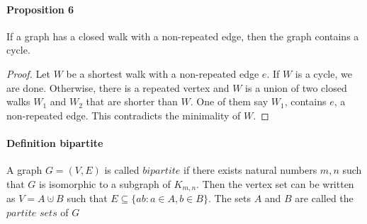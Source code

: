 \paragraph{Proposition 6} If a graph has a closed walk with a non-repeated edge, then
the graph contains a cycle.
\begin{proof}
    Let $ W $ be a shortest walk with a non-repeated edge $ e $. If $ W $ is a cycle, 
    we are done. Otherwise, there is a repeated vertex and $ W $ is a union of 
    two closed walks $ W_1 $ and $ W_2 $ that are shorter than $ W $. One of them
    say $ W_1 $, contains $ e$, a non-repeated edge. This contradicts the 
    minimality of $ W$.
\end{proof}

\paragraph{Definition bipartite}
A graph $ G = (V,E) $ is called $ bipartite $ if there exists natural numbers $ m,n $
such that $ G $ is isomorphic to a subgraph of $ K_{m,n} $. Then the vertex set 
can be written as $ V = A \cupdot B $ such that $ E \subseteq \{ab: a\in A,
b \in B\}$. The sets $ A $ and $ B $ are called the $ partite $ $ sets $ of $ G $



